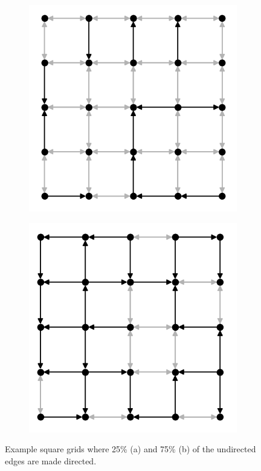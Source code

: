 \begin{figure}[t]
  \centering
  \begin{subfigure}{.40\textwidth}
    \centering
    \includegraphics[width=1.0\linewidth]{figures/dir_lattice_025.png}
    \caption{}
    \label{fig:dir-lattice-a}
  \end{subfigure}
  \hspace{25pt}
  \begin{subfigure}{.40\textwidth}
    \centering
    \includegraphics[width=1.0\linewidth]{figures/dir_lattice_075.png}
    \caption{}
    \label{fig:dir-lattice-b}
  \end{subfigure}
  \caption{
    Example square grids where 25\% (a) and 75\% (b) of the undirected edges are
made directed.
  }
  \label{fig:dir-lattice}
\end{figure}

